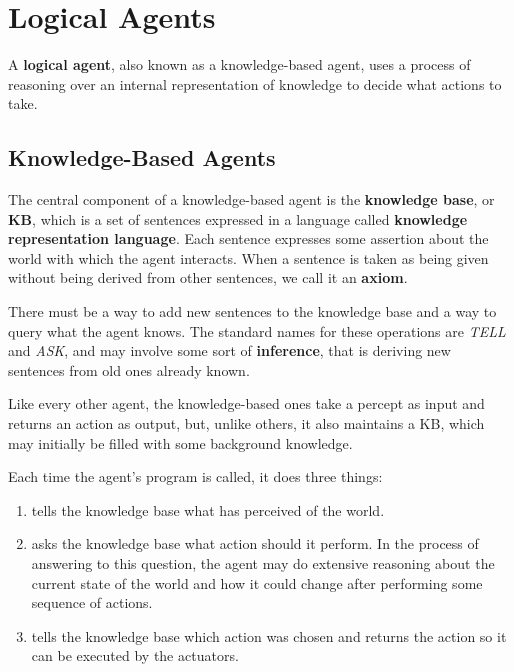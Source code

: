 \documentclass{article}
\begin{document}
\section{Logical Agents}
A \textbf{logical agent}, also known as a knowledge-based agent, uses a process of reasoning over an internal representation of knowledge to decide what actions to take.

\subsection{Knowledge-Based Agents}
The central component of a knowledge-based agent is the \textbf{knowledge base}, or \textbf{KB}, which is a set of sentences expressed in a language called \textbf{knowledge representation language}. Each sentence expresses some assertion about the world with which the agent interacts. When a sentence is taken as being given without being derived from other sentences, we call it an \textbf{axiom}.

There must be a way to add new sentences to the knowledge base and a way to query what the agent knows. The standard names for these operations are \textit{TELL} and \textit{ASK}, and may involve some sort of \textbf{inference}, that is deriving new sentences from old ones already known.

Like every other agent, the knowledge-based ones take a percept as input and returns an action as output, but, unlike others, it also maintains a KB, which may initially be filled with some background knowledge.  

Each time the agent's program is called, it does three things:
\begin{enumerate}
    \item tells the knowledge base what has perceived of the world.
    \item asks the knowledge base what action should it perform. In the process of answering to this question, the agent may do extensive reasoning about the current state of the world and how it could change after performing some sequence of actions.
    \item tells the knowledge base which action was chosen and returns the action so it can be executed by the actuators.
\end{enumerate}
\end{document}
